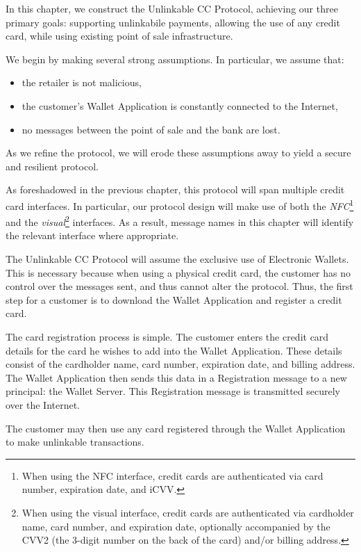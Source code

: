 In this chapter, we construct the Unlinkable CC Protocol, achieving our three primary goals:
supporting unlinkabile payments,
allowing the use of any credit card,
while using existing point of sale infrastructure.

We begin by making several strong assumptions.
In particular, we assume that:
\begin{itemize}
\item the retailer is not malicious,
\item the customer's Wallet Application is constantly connected to the Internet,
\item no messages between the point of sale and the bank are lost.
\end{itemize}
As we refine the protocol, we will erode these assumptions away to yield a secure and resilient protocol.

As foreshadowed in the previous chapter, this protocol will span multiple credit card interfaces.
In particular, our protocol design will make use of both the \emph{NFC}\footnote{
	When using the NFC interface, credit cards are authenticated via card number, expiration date, and iCVV.
} and the \emph{visual}\footnote{
	When using the visual interface, credit cards are authenticated via cardholder name, card number, and expiration date,
	optionally accompanied by the CVV2 (the 3-digit number on the back of the card) and/or billing address.
} interfaces.
As a result, message names in this chapter will identify the relevant interface where appropriate.

The Unlinkable CC Protocol will assume the exclusive use of Electronic Wallets.
This is necessary because when using a physical credit card, the customer has no control over the messages sent,
    and thus cannot alter the protocol.
Thus, the first step for a customer is to download the Wallet Application and register a credit card.

The card registration process is simple.
The customer enters the credit card details for the card he wishes to add into the Wallet Application.
These details consist of the cardholder name, card number, expiration date, and billing address.
The Wallet Application then sends this data in a Registration message to a new principal: the Wallet Server.
This Registration message is transmitted securely over the Internet.

The customer may then use any card registered through the Wallet Application to make unlinkable transactions.
